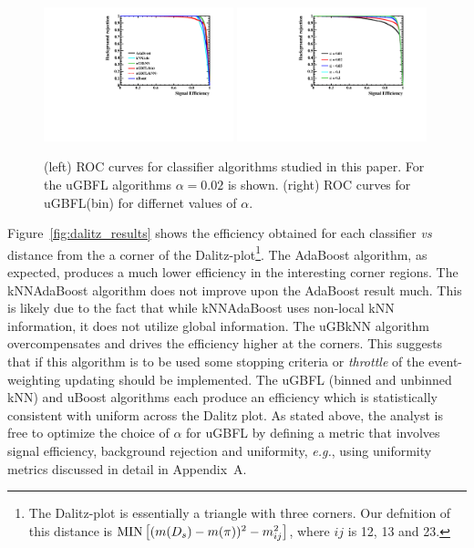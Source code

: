 \begin{figure}[] 
  \centering 
  \includegraphics[width=0.49\textwidth]{ROC_DP.pdf}
  \includegraphics[width=0.49\textwidth]{ROC_DP_Alpha.pdf}
  \caption{\label{fig:dalitz_rocs} (left) ROC curves for classifier algorithms studied in this paper.  For the uGBFL algorithms $\alpha=0.02$ is shown.  (right) ROC curves for uGBFL(bin) for differnet values of $\alpha$.}
\end{figure}

Figure~\ref{fig:dalitz_results} shows the efficiency obtained for each classifier {\em vs} distance from the a corner of the Dalitz-plot\footnote{The Dalitz-plot is essentially a triangle with three corners. Our defnition of this distance is ${\rm MIN}\left[(m(D_s)-m(\pi))^2 - m_{ij}^2\right]$, where $ij$ is 12, 13 and 23.}.  The AdaBoost algorithm, as expected, produces a much lower efficiency in the interesting corner regions.  The kNNAdaBoost algorithm does not improve upon the AdaBoost result much.  This is likely due to the fact that while kNNAdaBoost uses non-local kNN information, it does not utilize global information.  The uGBkNN algorithm overcompensates and drives the efficiency higher at the corners.  This suggests that if this algorithm is to be used some stopping criteria or {\em throttle} of the event-weighting updating should be implemented.  
The uGBFL (binned and unbinned kNN) and uBoost algorithms each produce an efficiency which is statistically consistent with uniform across the Dalitz plot.  
As stated above, the analyst is free to optimize the choice of $\alpha$ for uGBFL by defining a metric that involves signal efficiency, background rejection and uniformity, {\em e.g.}, using uniformity metrics discussed in detail in Appendix~A.  

